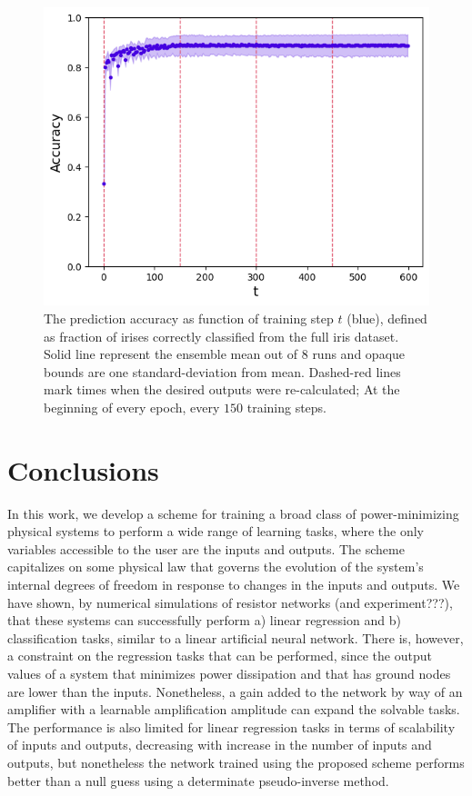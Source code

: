 \documentclass[%
 reprint,
 amsmath,amssymb,
 aps,
]{revtex4-2}
\begin{document}
{    \begin{figure}[ht]
    \centerline{
    \includegraphics[width=\columnwidth]{Figures/accuracy_vs_t_markers.png}
    }
    \caption{The prediction accuracy as function of training step $t$ (blue), defined as fraction of irises correctly classified from the full iris dataset. Solid line represent the ensemble mean out of $8$ runs and opaque bounds are one standard-deviation from mean. Dashed-red lines mark times when the desired outputs were re-calculated; At the beginning of every epoch, every $150$ training steps.}
    \label{fig:accuracy_vs_t}
    \end{figure} 

\section*{Conclusions}\label{sec:conclusions}

    In this work, we develop a scheme for training a broad class of power-minimizing physical systems to perform a wide range of learning tasks, where the only variables accessible to the user are the inputs and outputs. The scheme capitalizes on some physical law that governs the evolution of the system’s internal degrees of freedom in response to changes in the inputs and outputs. 
    We have shown, by numerical simulations of resistor networks \textcolor{roie}{(and experiment???)}, that these systems can successfully perform a) linear regression and b) classification tasks, similar to a linear artificial neural network. There is, however, a constraint on the regression tasks that can be performed, since the output values of a system that minimizes power dissipation and that has ground nodes are lower than the inputs. Nonetheless, a gain added to the network by way of an amplifier with a learnable amplification amplitude can expand the solvable tasks. The performance is also limited for linear regression tasks in terms of scalability of inputs and outputs, decreasing with increase in the number of inputs and outputs, but nonetheless the network trained using the proposed scheme performs better than a null guess using a determinate pseudo-inverse method. 
    
}
\end{document}
